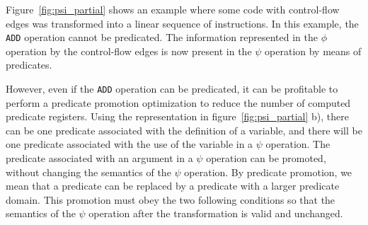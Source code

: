 Figure~\ref{fig:psi_partial} shows an example where some code with
control-flow edges was transformed into a linear sequence of
instructions. In this example, the {\tt ADD} operation cannot be
predicated. The information represented in the $\phi$ operation by the
control-flow edges is now present in the $\psi$ operation by means of
predicates.


However, even if the {\tt ADD} operation can be predicated, it can be
profitable to perform a predicate promotion optimization to reduce the
number of computed predicate registers. Using the representation in
figure~\ref{fig:psi_partial} b), there can be one predicate associated
with the definition of a variable, and there will be one predicate
associated with the use of the variable in a $\psi$ operation. The
predicate associated with an argument in a $\psi$ operation can be
promoted, without changing the semantics of the $\psi$ operation. By
predicate promotion, we mean that a predicate can be replaced by a
predicate with a larger predicate domain. This promotion must obey the
two following conditions so that the semantics of the $\psi$ operation
after the transformation is valid and unchanged.



